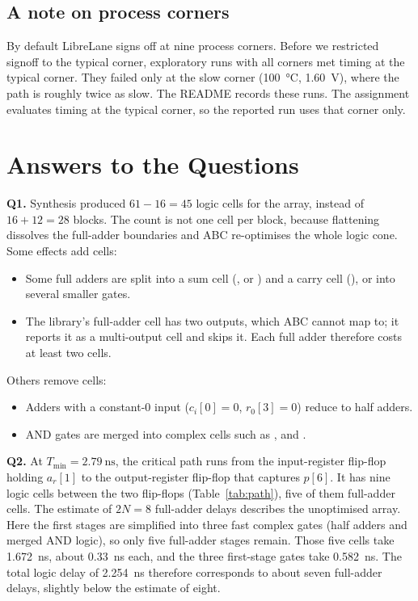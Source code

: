 \documentclass[conference,10pt]{IEEEtran}
\newcommand{\Tmin}{T_{\mathrm{min}}}
\begin{document}
\subsection{A note on process corners}
By default LibreLane signs off at nine process corners. Before we restricted signoff to the
typical corner, exploratory runs with all corners met timing at the typical corner. They failed
only at the slow corner (\SI{100}{\celsius}, \SI{1.60}{\volt}), where the path is roughly twice as
slow. The README records these runs. The assignment evaluates timing at the typical corner, so the
reported run uses that corner only.

\section{Answers to the Questions}

\textbf{Q1.} Synthesis produced $61 - 16 = 45$ logic cells for the array, instead of
$16 + 12 = 28$ blocks. The count is not one cell per block, because flattening dissolves the
full-adder boundaries and ABC re-optimises the whole logic cone. Some effects add cells:
\begin{itemize}
\item Some full adders are split into a sum cell (,  or ) and a
carry cell (), or into several smaller gates.
\item The library's full-adder cell  has two outputs, which ABC cannot map to; it reports
it as a multi-output cell and skips it. Each full adder therefore costs at least two cells.
\end{itemize}
Others remove cells:
\begin{itemize}
\item Adders with a constant-0 input ($c_i[0] = 0$, $r_0[3] = 0$) reduce to half adders.
\item AND gates are merged into complex cells such as ,  and
.
\end{itemize}

\textbf{Q2.} At $\Tmin = \SI{2.79}{\nano\second}$, the critical path runs from the input-register
flip-flop holding $a_r[1]$ to the output-register flip-flop that captures $p[6]$. It has nine logic
cells between the two flip-flops (Table~\ref{tab:path}), five of them full-adder cells. The estimate
of $2N = 8$ full-adder delays describes the unoptimised array. Here the first stages are simplified
into three fast complex gates (half adders and merged AND logic), so only five full-adder stages
remain. Those five cells take \SI{1.672}{\nano\second}, about \SI{0.33}{\nano\second} each, and the
three first-stage gates take \SI{0.582}{\nano\second}. The total logic delay of
\SI{2.254}{\nano\second} therefore corresponds to about seven full-adder delays, slightly below the
estimate of eight.
\end{document}
